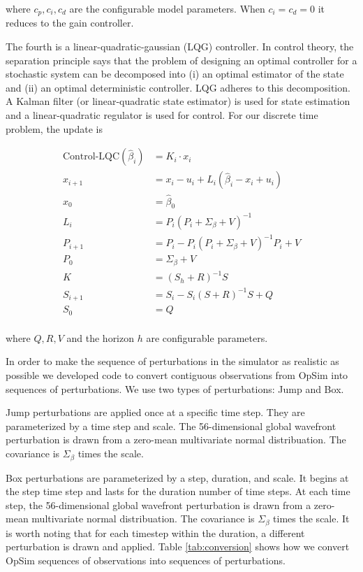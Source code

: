 \noindent where $c_p, c_i, c_d$ are the configurable model parameters. When $c_i = c_d = 0$ it reduces to the gain controller.

The fourth is a linear-quadratic-gaussian (LQG) controller. In control theory, the separation principle says that the problem of designing an optimal controller for a stochastic system can be decomposed into (i) an optimal estimator of the state and (ii) an optimal deterministic controller. LQG adheres to this decomposition. A Kalman filter (or linear-quadratic state estimator) is used for state estimation and a linear-quadratic regulator is used for control. For our discrete time problem, the update is

\begin{align*}
\text{Control-LQC}(\hat{\beta}_i) &= K_i \cdot x_i\\
x_{i+1} &= x_i - u_i + L_i (\hat{\beta}_i - x_i + u_i)\\
x_0 &= \hat{\beta}_0\\
L_i &= P_i(P_i + \Sigma_{\beta} + V)^{-1}\\
P_{i+1} &= P_{i} - P_i (P_i + \Sigma_{\beta} + V)^{-1} P_i + V\\
P_0 &= \Sigma_{\beta} + V\\
K &= (S_h + R)^{-1} S\\
S_{i+1} &= S_i - S_i (S + R)^{-1}S + Q\\
S_0 &= Q\\
\end{align*}

\noindent where $Q,R,V$ and the horizon $h$ are configurable parameters.

In order to make the sequence of perturbations in the simulator as realistic as possible we developed code to convert contiguous observations from OpSim into sequences of perturbations. We use two types of perturbations: Jump and Box. 

Jump perturbations are applied once at a specific time step. They are parameterized by a time step and scale. The 56-dimensional global wavefront perturbation is drawn from a zero-mean multivariate normal distribuation. The covariance is $\Sigma_{\beta}$ times the scale. 

Box perturbations are parameterized by a step, duration, and scale. It begins at the step time step and lasts for the duration number of time steps. At each time step, the 56-dimensional global wavefront perturbation is drawn from a zero-mean multivariate normal distribuation. The covariance is $\Sigma_{\beta}$ times the scale. It is worth noting that for each timestep within the duration, a different perturbation is drawn and applied. Table \ref{tab:conversion} shows how we convert OpSim sequences of observations into sequences of perturbations.

